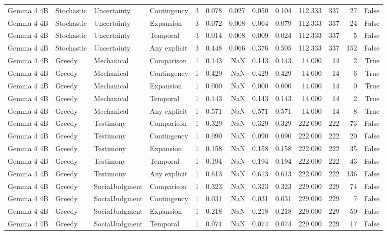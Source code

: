\begin{tabular}{llllrrrrrrrrr}
Gemma 4 4B & Stochastic & Uncertainty & Contingency & 3 & 0.078 & 0.027 & 0.050 & 0.104 & 112.333 & 337 & 27 & False \\
Gemma 4 4B & Stochastic & Uncertainty & Expansion & 3 & 0.072 & 0.008 & 0.064 & 0.079 & 112.333 & 337 & 24 & False \\
Gemma 4 4B & Stochastic & Uncertainty & Temporal & 3 & 0.014 & 0.008 & 0.009 & 0.024 & 112.333 & 337 & 5 & False \\
Gemma 4 4B & Stochastic & Uncertainty & Any explicit & 3 & 0.448 & 0.066 & 0.376 & 0.505 & 112.333 & 337 & 152 & False \\
Gemma 4 4B & Greedy & Mechanical & Comparison & 1 & 0.143 & NaN & 0.143 & 0.143 & 14.000 & 14 & 2 & True \\
Gemma 4 4B & Greedy & Mechanical & Contingency & 1 & 0.429 & NaN & 0.429 & 0.429 & 14.000 & 14 & 6 & True \\
Gemma 4 4B & Greedy & Mechanical & Expansion & 1 & 0.000 & NaN & 0.000 & 0.000 & 14.000 & 14 & 0 & True \\
Gemma 4 4B & Greedy & Mechanical & Temporal & 1 & 0.143 & NaN & 0.143 & 0.143 & 14.000 & 14 & 2 & True \\
Gemma 4 4B & Greedy & Mechanical & Any explicit & 1 & 0.571 & NaN & 0.571 & 0.571 & 14.000 & 14 & 8 & True \\
Gemma 4 4B & Greedy & Testimony & Comparison & 1 & 0.329 & NaN & 0.329 & 0.329 & 222.000 & 222 & 73 & False \\
Gemma 4 4B & Greedy & Testimony & Contingency & 1 & 0.090 & NaN & 0.090 & 0.090 & 222.000 & 222 & 20 & False \\
Gemma 4 4B & Greedy & Testimony & Expansion & 1 & 0.158 & NaN & 0.158 & 0.158 & 222.000 & 222 & 35 & False \\
Gemma 4 4B & Greedy & Testimony & Temporal & 1 & 0.194 & NaN & 0.194 & 0.194 & 222.000 & 222 & 43 & False \\
Gemma 4 4B & Greedy & Testimony & Any explicit & 1 & 0.613 & NaN & 0.613 & 0.613 & 222.000 & 222 & 136 & False \\
Gemma 4 4B & Greedy & SocialJudgment & Comparison & 1 & 0.323 & NaN & 0.323 & 0.323 & 229.000 & 229 & 74 & False \\
Gemma 4 4B & Greedy & SocialJudgment & Contingency & 1 & 0.031 & NaN & 0.031 & 0.031 & 229.000 & 229 & 7 & False \\
Gemma 4 4B & Greedy & SocialJudgment & Expansion & 1 & 0.218 & NaN & 0.218 & 0.218 & 229.000 & 229 & 50 & False \\
Gemma 4 4B & Greedy & SocialJudgment & Temporal & 1 & 0.074 & NaN & 0.074 & 0.074 & 229.000 & 229 & 17 & False \\

\end{tabular}
